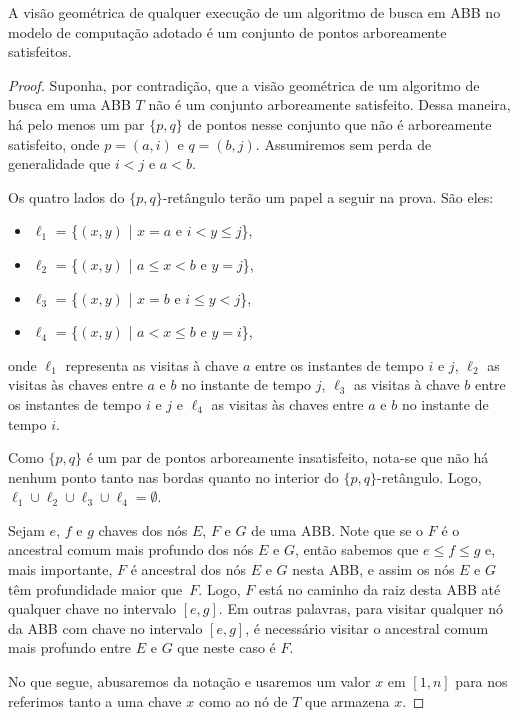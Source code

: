 \begin{lemma} A visão geométrica de qualquer execução de um algoritmo de busca em ABB no modelo de computação adotado é um conjunto de pontos arboreamente satisfeitos.
\label{lema:visao_geometrica_vira_ASS}
\end{lemma}

\begin{proof}
Suponha, por contradição, que a visão geométrica de um algoritmo de busca em uma ABB $T$ não é um conjunto arboreamente satisfeito. Dessa maneira, há pelo menos um par $\{p,q\}$ de pontos nesse conjunto que não é arboreamente satisfeito, onde $p = (a,i)$ e $q = (b,j)$. Assumiremos sem perda de generalidade que $i < j$ e $a < b$.

Os quatro lados do $\{p,q\}$-retângulo terão um papel a seguir na prova. São eles:
\begin{itemize}
    \item $\ell_1$ = \{$(x,y)$ | $x = a$ e $i < y \leq j$\},
    \item $\ell_2$ = \{$(x,y)$ | $a \leq x < b$ e $y = j$\},
    \item $\ell_3$ = \{$(x,y)$ | $x = b$ e $i \leq y < j$\},
    \item $\ell_4$ = \{$(x,y)$ | $a < x \leq b$ e $y = i$\},
\end{itemize}
onde $\ell_1$ representa as visitas à chave $a$ entre os instantes de tempo $i$ e $j$, $\ell_2$ as visitas às chaves entre $a$ e $b$ no instante de tempo $j$, $\ell_3$ as visitas à chave $b$ entre os instantes de tempo $i$ e $j$ e $\ell_4$ as visitas às chaves entre $a$ e $b$ no instante de tempo $i$.

Como $\{p,q\}$ é um par de pontos arboreamente insatisfeito, nota-se que não há nenhum ponto tanto nas bordas quanto no interior do $\{p,q\}$-retângulo. Logo, $\ell_1 \cup \ell_2 \cup \ell_3 \cup \ell_4 = \emptyset$.

Sejam $e$, $f$ e $g$ chaves dos nós $E$, $F$ e $G$ de uma ABB. Note que se o $F$ é o ancestral comum mais profundo dos nós $E$ e $G$, então sabemos que $e \leq f \leq g$ e, mais importante, $F$ é ancestral dos nós $E$ e $G$ nesta ABB, e assim os nós $E$ e $G$ têm profundidade maior que~$F$. Logo, $F$ está no caminho da raiz desta ABB até qualquer chave no intervalo $[e,g]$. Em outras palavras, para visitar qualquer nó da ABB com chave no intervalo $[e,g]$, é necessário visitar o ancestral comum mais profundo entre $E$ e $G$ que neste caso é $F$.

No que segue, abusaremos da notação e usaremos um valor $x$ em $[1,n]$ para nos referimos tanto a uma chave $x$ como ao nó de $T$ que armazena $x$.


\end{proof}
